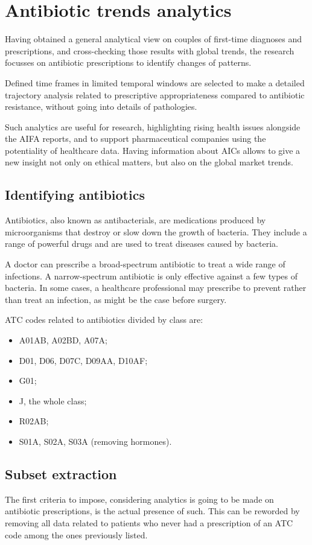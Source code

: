 \chapter{Antibiotic trends analytics}
Having obtained a general analytical view on couples of first-time diagnoses and prescriptions, and cross-checking those results with global trends, the research focusses on antibiotic prescriptions to identify changes of patterns.

Defined time frames in limited temporal windows are selected to make a detailed trajectory analysis related to prescriptive appropriateness compared to antibiotic resistance, without going into details of pathologies.

Such analytics are useful for research, highlighting rising health issues alongside the AIFA reports, and to support pharmaceutical companies using the potentiality of healthcare data. Having information about AICs allows to give a new insight not only on ethical matters, but also on the global market trends.

\section{Identifying antibiotics}
Antibiotics, also known as antibacterials, are medications produced by microorganisms that destroy or slow down the growth of bacteria. They include a range of powerful drugs and are used to treat diseases caused by bacteria. 

A doctor can prescribe a broad-spectrum antibiotic to treat a wide range of infections. A narrow-spectrum antibiotic is only effective against a few types of bacteria. In some cases, a healthcare professional may prescribe to prevent rather than treat an infection, as might be the case before surgery. 
 
 ATC codes related to antibiotics divided by class are:
 \begin{itemize}
 	\item A01AB, A02BD, A07A;
 	\item D01, D06, D07C, D09AA, D10AF;
 	\item G01;
 	\item J, the whole class;
 	\item R02AB;
 	\item S01A, S02A, S03A (removing hormones).
 \end{itemize}

\section{Subset extraction}
The first criteria to impose, considering analytics is going to be made on antibiotic prescriptions, is the actual presence of such. This can be reworded by removing all data related to patients who never had a prescription of an ATC code among the ones previously listed.

